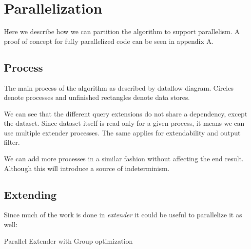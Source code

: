 \chapter{Parallelization}

Here we describe how we can partition the algorithm to support parallelism.
A proof of concept for fully parallelized code can be seen in appendix A.

\section{Process}

The main process of the algorithm as described by dataflow diagram.\cite{Kahn74,Lee95} 
Circles denote processes and unfinished rectangles denote data stores.

\begin{figure}[H]
	
\end{figure}

We can see that the different query extensions do not share a dependency, except the dataset.
Since dataset itself is read-only for a given process, it means we can use multiple extender processes. 
The same applies for extendability and output filter.

\begin{figure}[H]
	
\end{figure}

We can add more processes in a similar fashion without affecting the end result. Although this will introduce a source of indeterminism.

\section{Extending}

Since much of the work is done in \emph{extender} it could be useful to parallelize it as well:

\begin{algorithm}[H]
	\caption{Parallel Extender with Group optimization}
\begin{algorithmic}[1]

\end{algorithmic}
\end{algorithm}

